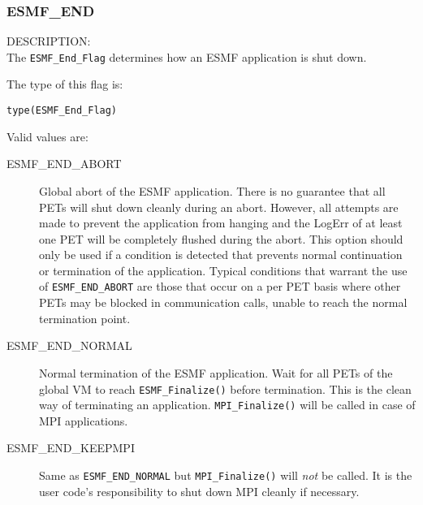 
\subsubsection{ESMF\_END}
\label{app:endflag}

{\sf DESCRIPTION:\\}
The {\tt ESMF\_End\_Flag} determines how an ESMF application is shut down.

The type of this flag is:

{\tt type(ESMF\_End\_Flag)}

Valid values are:
\begin{description}
   \item [ESMF\_END\_ABORT] 
         Global abort of the ESMF application. There is no guarantee 
         that all PETs will shut down cleanly during an abort. However, all
         attempts are made to prevent the application from hanging and the
         LogErr of at least one PET will be completely flushed during the abort.
         This option should only be used if a condition is detected that
         prevents normal continuation or termination of the application.
         Typical conditions that warrant the use of {\tt ESMF\_END\_ABORT} are those
         that occur on a per PET basis where other PETs may be blocked in 
         communication calls, unable to reach the normal termination point.
   \item [ESMF\_END\_NORMAL]
         \begin{sloppypar}
         Normal termination of the ESMF application. Wait for all PETs of the
         global VM to reach 
	{\tt ESMF\_Finalize()} before termination. This is
         the clean way of terminating an application. {\tt MPI\_Finalize()} will
         be called in case of MPI applications.
         \end{sloppypar}
   \item [ESMF\_END\_KEEPMPI]
         Same as {\tt ESMF\_END\_NORMAL} but {\tt MPI\_Finalize()} will {\em not}
         be called. It is the user code's responsibility to shut down MPI
         cleanly if necessary.
\end{description}
